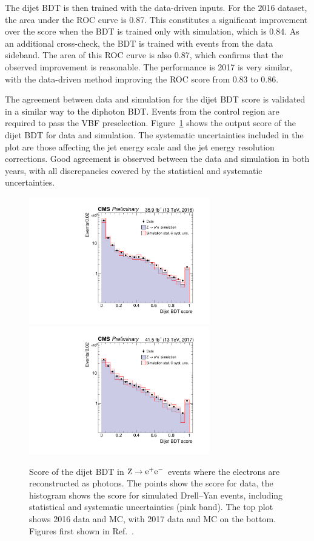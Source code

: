 The dijet BDT is then trained with the data-driven inputs.
For the 2016 dataset, the area under the ROC curve is 0.87.
This constitutes a significant improvement over the score when the BDT is trained only with simulation, 
which is 0.84.
As an additional cross-check, the BDT is trained with events from the data sideband. 
The area of this ROC curve is also 0.87, 
which confirms that the observed improvement is reasonable.
The performance is 2017 is very similar, 
with the data-driven method improving the ROC score from 0.83 to 0.86.

The agreement between data and simulation for the dijet BDT score is validated 
in a similar way to the diphoton BDT.
Events from the \Zee control region are required to pass the VBF preselection.
Figure~\ref{fig:cat_dijetBDT} shows the output score of the dijet BDT for data and simulation.
The systematic uncertainties included in the plot are those affecting the 
jet energy scale and the jet energy resolution corrections.
Good agreement is observed between the data and simulation in both years, 
with all discrepancies covered by the statistical and systematic uncertainties.

\begin{figure}[hptb]
  \centering
  \includegraphics[width=0.7\textwidth]{Figures/Categorisation/DijetBDT_2016.pdf}
  \includegraphics[width=0.7\textwidth]{Figures/Categorisation/DijetBDT_2017.pdf}
  \caption[Validation of the dijet BDT in \Zee events.]
  {
    Score of the dijet BDT in $\mathrm{Z}\rightarrow{\mathrm{e}^{+}\mathrm{e}^{-}}$
    events where the electrons are reconstructed as photons.
    The points show the score for data, the histogram shows
    the score for simulated Drell--Yan events, including statistical and 
    systematic uncertainties (pink band).
    The top plot shows 2016 data and MC,
    with 2017 data and MC on the bottom.
    Figures first shown in Ref.~\cite{HIG-18-029}.
  }
  \label{fig:cat_dijetBDT}
\end{figure}

